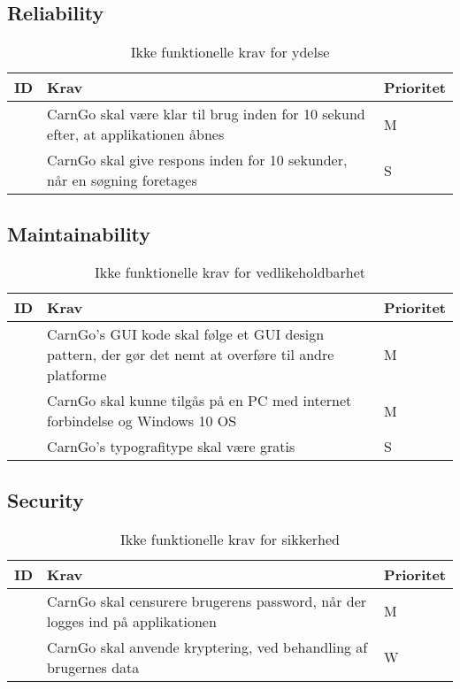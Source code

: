 \documentclass[Kravspecifikation/Kravspec_Main.tex]{subfiles}
\begin{document}
\subsection{Reliability}
\begin{table}[H]
\centering
\begin{tabular}{|L{0.1\textwidth}|L{0.6\textwidth}|L{0.15\textwidth}|}
\hline
\textbf{ID} & \textbf{Krav} & \textbf{Prioritet} \\ \hline
\subreq{}  & CarnGo skal være klar til brug inden for 10 sekund efter, at applikationen åbnes & M \\ \hline
\subreq{}  & CarnGo skal give respons inden for 10 sekunder, når en søgning foretages & S \\ \hline
\end{tabular}
\caption{Ikke funktionelle krav for ydelse}
\label{tab:performance}
\end{table}

\subsection{Maintainability}
\begin{table}[H]
\centering
\begin{tabular}{|L{0.1\textwidth}|L{0.6\textwidth}|L{0.15\textwidth}|}
\hline
\textbf{ID} & \textbf{Krav} & \textbf{Prioritet} \\ \hline
\subreq{}  & CarnGo's GUI kode skal følge et GUI design pattern, der gør det nemt at overføre til andre platforme & M \\ \hline
\subreq{}  & CarnGo skal kunne tilgås på en PC med internet forbindelse og Windows 10 OS & M \\ \hline
\subreq{}  & CarnGo's typografitype skal være gratis & S \\ \hline
\end{tabular}
\caption{Ikke funktionelle krav for vedlikeholdbarhet}
\label{tab:vedlikeholdbarhet}
\end{table}

\subsection{Security}
\begin{table}[H]
\centering
\begin{tabular}{|L{0.1\textwidth}|L{0.6\textwidth}|L{0.15\textwidth}|}
\hline
\textbf{ID} & \textbf{Krav} & \textbf{Prioritet} \\ \hline
\subreq{}  & CarnGo skal censurere brugerens password, når der logges ind på applikationen & M \\ \hline
\subreq{}  & CarnGo skal anvende kryptering, ved behandling af brugernes data & W \\ \hline
\end{tabular}
\caption{Ikke funktionelle krav for sikkerhed}
\label{tab:sikkerhet}
\end{table}
\end{document}
